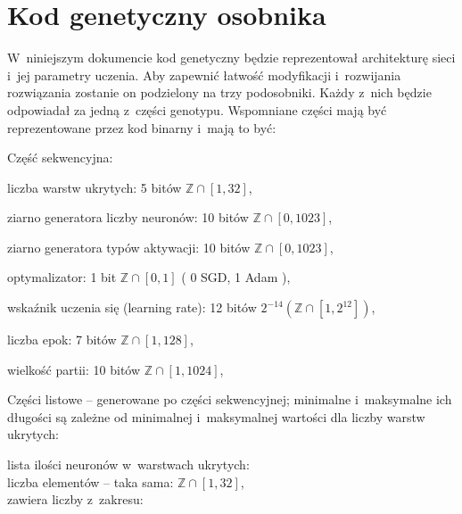 \section{Kod genetyczny osobnika}
\label{sec:individual_genetic_code}
W~niniejszym dokumencie kod genetyczny
będzie reprezentował architekturę sieci
i~jej parametry uczenia.
Aby zapewnić łatwość modyfikacji
i~rozwijania rozwiązania zostanie
on podzielony na trzy podosobniki.
Każdy z~nich będzie odpowiadał
za jedną z~części genotypu.
Wspomniane części mają być reprezentowane
przez kod binarny i~mają to być:
\begin{nospitemize}
  \item Część sekwencyjna:
    \begin{nospitemize}
      \item liczba warstw ukrytych:
        5 bitów $\mathbb{Z} \cap \left[1, 32\right]$,
      \item ziarno generatora liczby neuronów:
        10 bitów $\mathbb{Z} \cap \left[0, 1023\right]$,
      \item ziarno generatora typów aktywacji:
        10 bitów $\mathbb{Z} \cap \left[0, 1023\right]$,
      \item optymalizator:
        1 bit $\mathbb{Z} \cap \left[0, 1\right]$
        (%
          0 {\textrightarrow} SGD,
          1 {\textrightarrow} Adam%
        ),
      \item wskaźnik uczenia się (learning rate):
        12 bitów $2^{-14}\left(
          \mathbb{Z} \cap \left[1, 2^{12}\right]
        \right)$,
      \item liczba epok:
        7 bitów $\mathbb{Z} \cap \left[1, 128\right]$,
      \item wielkość partii:
        10 bitów $\mathbb{Z} \cap \left[1, 1024\right]$,
    \end{nospitemize}
  \item Części listowe
    -- generowane po części sekwencyjnej;
    minimalne i~maksymalne ich długości
    są zależne od minimalnej
    i~maksymalnej wartości
    dla liczby warstw ukrytych:
    \begin{nospitemize}
      \item lista ilości neuronów w~warstwach ukrytych:
        \\\hspace*{1em}liczba elementów -- taka sama:
          $\mathbb{Z} \cap \left[1, 32\right]$,
        \\\hspace*{1em}zawiera liczby z~zakresu:

\end{nospitemize}
\end{nospitemize}
